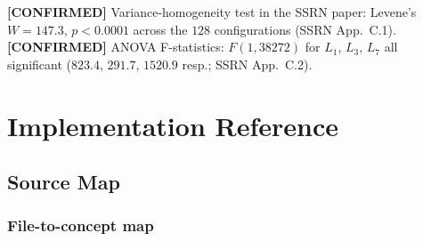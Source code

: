\documentclass[11pt,letterpaper,openany]{book}
\theoremstyle{definition}
\theoremstyle{plain}
\newcommand{\confirmed}{\textcolor{green!50!black}{\textbf{[CONFIRMED]}}\xspace}
\newcommand{\Loop}[1]{L_{#1}}
\begin{document}
\confirmed Variance-homogeneity test in the SSRN paper: Levene's
$W = 147.3$, $p < 0.0001$ across the $128$ configurations (SSRN App.~C.1).
\confirmed ANOVA F-statistics: $F(1,38272)$ for $\Loop{1}$, $\Loop{3}$,
$\Loop{7}$ all significant ($823.4$, $291.7$, $1520.9$ resp.;
SSRN App.~C.2).

\part{Implementation Reference}

\chapter{Source Map}
\label{ch:source-map}

\section{File-to-concept map}
\end{document}
